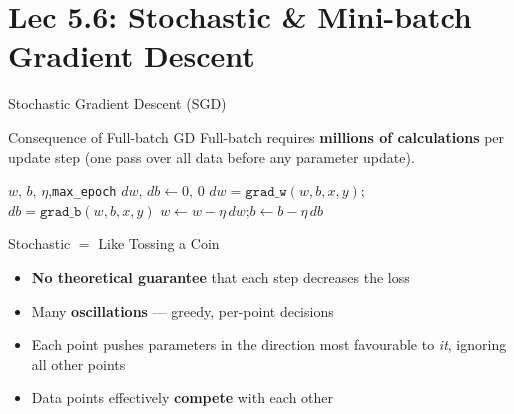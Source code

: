 \documentclass{beamer}
\begin{document}
\section{Lec 5.6: Stochastic \& Mini-batch Gradient Descent}

\begin{frame}[shrink=10]{Stochastic Gradient Descent (SGD)}
  \begin{block}{Consequence of Full-batch GD}
    Full-batch requires \textbf{millions of calculations} per update step
    (one pass over all data before any parameter update).
  \end{block}

  \medskip

  \begin{algorithm}[H]
  \begin{algorithmic}[1]
    \REQUIRE $w,\,b,\,\eta$,\;\texttt{max\_epoch}
      \STATE $dw,\,db \leftarrow 0,\,0$
        \STATE $dw = \texttt{grad\_w}(w,b,x,y)$;\quad
               $db = \texttt{grad\_b}(w,b,x,y)$
        \STATE $w \leftarrow w-\eta\,dw$;\quad $b \leftarrow b-\eta\,db$
      \ENDFOR
    \ENDFOR
  \end{algorithmic}
  \caption{Stochastic Gradient Descent (update per point)}
  \end{algorithm}

  \medskip

  \begin{alertblock}{Stochastic $=$ Like Tossing a Coin}
    \begin{itemize}\setlength\itemsep{4pt}
      \item \textbf{No theoretical guarantee} that each step decreases
            the loss
      \item Many \textbf{oscillations} --- greedy, per-point decisions
      \item Each point pushes parameters in the direction most favourable
            to \emph{it}, ignoring all other points
      \item Data points effectively \textbf{compete} with each other
    \end{itemize}
  \end{alertblock}
\end{frame}
\end{document}

